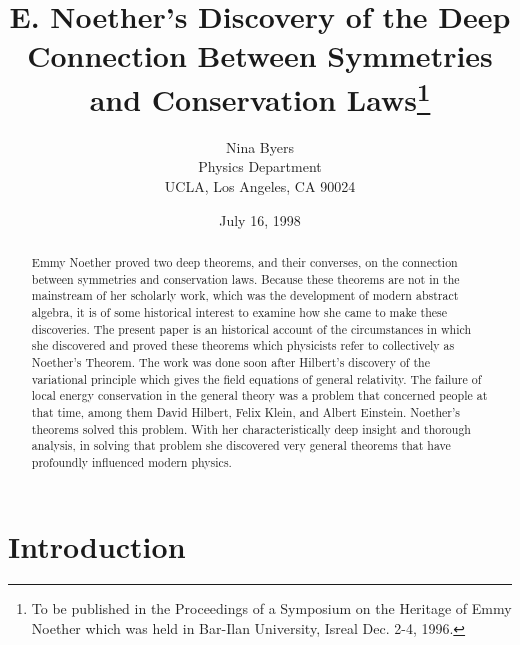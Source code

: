 \documentclass[12pt]{article}
\begin{document}
\title{E. Noether's Discovery of the Deep Connection Between
Symmetries and
                   Conservation Laws\footnote{To be published in
the Proceedings of a
Symposium on the Heritage of Emmy Noether which was held in 
Bar-Ilan University, Isreal Dec. 2-4,
1996.}}


\author{Nina Byers \\Physics
Department\\ UCLA, Los Angeles, CA 90024}
 \date{July 16, 1998}
 \maketitle

\begin{abstract} 
Emmy Noether proved two deep theorems, and their converses, on
 the connection between symmetries and conservation laws. Because these
 theorems are not in the mainstream of her scholarly work, 
  which was the development of modern
 abstract algebra,  it is of some historical interest to examine how
 she came to make these discoveries.  The present paper is an historical account of the
 circumstances in which she  discovered and proved  these theorems which
 physicists refer to collectively as Noether's Theorem.  The work was done 
 soon after  Hilbert's discovery of the variational principle which
 gives the field equations of general relativity.  The failure of local energy
 conservation in the general theory was a problem that concerned people at that
 time, among them David Hilbert, Felix Klein, and Albert Einstein.  Noether's
 theorems solved this problem.  With her characteristically deep insight and
 thorough analysis, in solving that problem she discovered very general theorems
 that have profoundly influenced modern physics. 
 \end{abstract}





\section{Introduction} 
\end{document}
